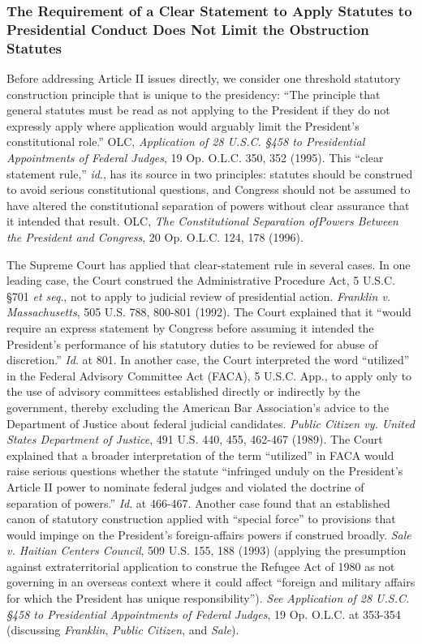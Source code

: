 \subsubsection{The Requirement of a Clear Statement to Apply Statutes to Presidential Conduct Does Not Limit the Obstruction Statutes}

Before addressing Article II issues directly, we consider one threshold statutory construction principle that is unique to the presidency: “The principle that general statutes must be read as not applying to the President if they do not expressly apply where application would arguably limit the President’s constitutional role.”
OLC, \textit{Application of 28 U.S.C. \S 458 to Presidential Appointments of Federal Judges}, 19 Op. O.L.C. 350, 352 (1995).
This “clear statement rule,” \textit{id}., has its source in two principles: statutes should be construed to avoid serious constitutional questions, and Congress should not be assumed to have altered the constitutional separation of powers without clear assurance that it intended that result.
OLC, \textit{The Constitutional Separation ofPowers Between the President and Congress}, 20 Op. O.L.C. 124, 178 (1996).

The Supreme Court has applied that clear-statement rule in several cases.
In one leading case, the Court construed the Administrative Procedure Act, 5 U.S.C. \S 701 \textit{et seq}., not to apply to judicial review of presidential action.
\textit{Franklin v. Massachusetts}, 505 U.S. 788, 800-801 (1992).
The Court explained that it “would require an express statement by Congress before assuming it intended the President’s performance of his statutory duties to be reviewed for abuse of discretion.”
\textit{Id}. at 801.
In another case, the Court interpreted the word “utilized” in the Federal Advisory Committee Act (FACA), 5 U.S.C. App., to apply only to the use of advisory committees established directly or indirectly by the government, thereby excluding the American Bar Association’s advice to the Department of Justice about federal judicial candidates.
\textit{Public Citizen vy. United States Department of Justice}, 491 U.S. 440, 455, 462-467 (1989).
The Court explained that a broader interpretation of the term “utilized” in FACA would raise serious questions whether the statute “infringed unduly on the President’s Article II power to nominate federal judges and violated the doctrine of separation of powers.”
\textit{Id}. at 466-467.
Another case found that an established canon of statutory construction applied with “special force” to provisions that would impinge on the President’s foreign-affairs powers if construed broadly.
\textit{Sale v. Haitian Centers Council}, 509 U.S. 155, 188 (1993) (applying the presumption against extraterritorial application to construe the Refugee Act of 1980 as not governing in an overseas context where it could affect “foreign and military affairs for which the President has unique responsibility”).
\textit{See Application of 28 U.S.C. \S 458 to Presidential Appointments of Federal Judges}, 19 Op. O.L.C. at 353-354 (discussing \textit{Franklin}, \textit{Public Citizen}, and \textit{Sale}).

